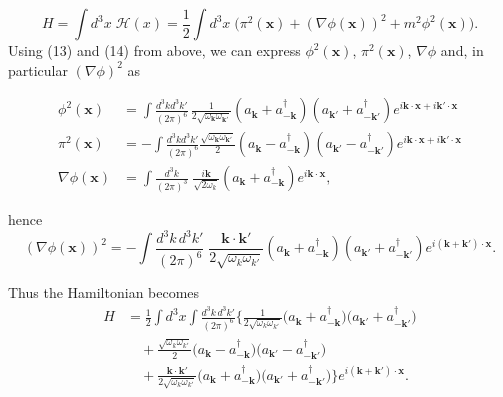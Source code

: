 \documentclass[12pt]{article}
\newcommand{\w}{\omega}
\begin{document}
\[
H=\int d^3x\;\mathcal{H}(x)
=\frac{1}{2}\int
d^3x\;\big(\pi^2(\mathbf{x})+(\nabla\phi(\mathbf{x}))^2+m^2\phi^2(\mathbf{x})\big).
\]
Using (13) and (14) from above, we can express $\phi^2(\mathbf{x})$, 
$\pi^2(\mathbf{x})$, $\nabla\phi$ and, in particular $(\nabla\phi)^2$ as 

\begin{align*}
    \phi^2(\mathbf{x}) &= \int \frac{d^3kd^3k'}{(2\pi)^6} \,
    \frac{1}{2\sqrt{\omega_{\mathbf{k}}\omega_{\mathbf{k'}}}}
    \left( a_{\mathbf{k}} + a_{-\mathbf{k}}^{\dagger} \right) \left(
    a_{\mathbf{k'}} + a_{-\mathbf{k'}}^{\dagger} \right)
    e^{i\mathbf{k}\cdot \mathbf{x} + i\mathbf{k'}\cdot \mathbf{x}} \\
\pi^2(\mathbf{x}) &= - \int\frac{d^3kd^3k'}{(2\pi)^6}
\frac{\sqrt{\w_{\mathbf{k}}\w_{\mathbf{k'}}}}{2} \left( a_{\mathbf{k}} -
a_{-\mathbf{k}}^{\dagger} \right) \left( a_{\mathbf{k'}} -
a_{-\mathbf{k'}}^{\dagger} \right) e^{i\mathbf{k}\cdot \mathbf{x} +
i\mathbf{k'}\cdot \mathbf{x}} \\
\nabla\phi(\mathbf{x}) &=
\int\frac{d^3k}{(2\pi)^3}\;\frac{i\mathbf{k}}{\sqrt{2\omega_k}}
\left( a_{\mathbf{k}} + a_{-\mathbf{k}}^{\dagger} \right)e^{i\mathbf{k}\cdot\mathbf{x}},
\end{align*}

hence
\[
(\nabla\phi(\mathbf{x}))^2
= -\int\frac{d^3k\,d^3k'}{(2\pi)^6}\;
\frac{\mathbf{k}\!\cdot\!\mathbf{k}'}{2\sqrt{\omega_k\omega_{k'}}} \left(
a_{\mathbf{k}} + a_{-\mathbf{k}}^{\dagger} \right)\left( a_{\mathbf{k}'} +
a_{-\mathbf{k}'}^{\dagger} \right)
e^{i(\mathbf{k}+\mathbf{k}')\cdot\mathbf{x}}.
\]

Thus the Hamiltonian becomes
\begin{align*}
H &= \frac{1}{2} \int d^3x \int \frac{d^3k\,d^3k'}{(2\pi)^6} 
   \Bigg\{
      \frac{1}{2\sqrt{\omega_k \omega_{k'}}}
      \bigl(a_{\mathbf{k}} + a_{-\mathbf{k}}^{\dagger}\bigr)
      \bigl(a_{\mathbf{k'}} + a_{-\mathbf{k'}}^{\dagger}\bigr) \\
&\quad + \frac{\sqrt{\omega_k \omega_{k'}}}{2}
      \bigl(a_{\mathbf{k}} - a_{-\mathbf{k}}^{\dagger}\bigr)
      \bigl(a_{\mathbf{k'}} - a_{-\mathbf{k'}}^{\dagger}\bigr) \\
&\quad + \frac{\mathbf{k}\!\cdot\!\mathbf{k}'}{2\sqrt{\omega_k \omega_{k'}}}
      \bigl(a_{\mathbf{k}} + a_{-\mathbf{k}}^{\dagger}\bigr)
      \bigl(a_{\mathbf{k'}} + a_{-\mathbf{k'}}^{\dagger}\bigr)
   \Bigg\}
   e^{i(\mathbf{k}+\mathbf{k}')\cdot \mathbf{x}} .
\end{align*}
\end{document}
